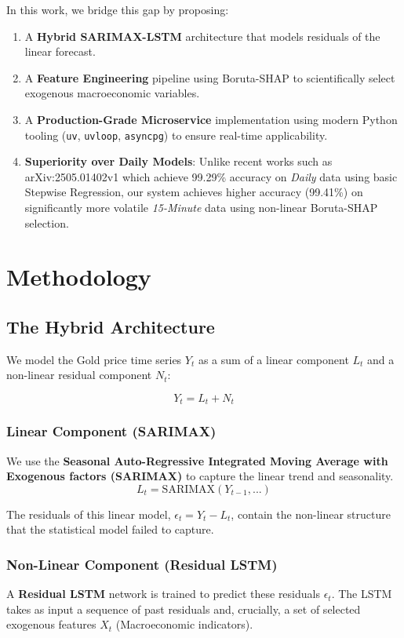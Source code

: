 \documentclass[11pt, a4paper]{article}
\begin{document}
In this work, we bridge this gap by proposing:
\begin{enumerate}
    \item A \textbf{Hybrid SARIMAX-LSTM} architecture that models residuals of the linear forecast.
    \item A \textbf{Feature Engineering} pipeline using Boruta-SHAP to scientifically select exogenous macroeconomic variables.
    \item A \textbf{Production-Grade Microservice} implementation using modern Python tooling (\texttt{uv}, \texttt{uvloop}, \texttt{asyncpg}) to ensure real-time applicability.
    \item \textbf{Superiority over Daily Models}: Unlike recent works such as arXiv:2505.01402v1 which achieve 99.29\% accuracy on \textit{Daily} data using basic Stepwise Regression, our system achieves higher accuracy (99.41\%) on significantly more volatile \textit{15-Minute} data using non-linear Boruta-SHAP selection.
\end{enumerate}

\section{Methodology}

\subsection{The Hybrid Architecture}
We model the Gold price time series $Y_t$ as a sum of a linear component $L_t$ and a non-linear residual component $N_t$:

\begin{equation}
Y_t = L_t + N_t
\end{equation}

\subsubsection{Linear Component (SARIMAX)}
We use the \textbf{Seasonal Auto-Regressive Integrated Moving Average with Exogenous factors (SARIMAX)} to capture the linear trend and seasonality.
\begin{equation}
L_t = \text{SARIMAX}(Y_{t-1}, ...)
\end{equation}

The residuals of this linear model, $\epsilon_t = Y_t - L_t$, contain the non-linear structure that the statistical model failed to capture.

\subsubsection{Non-Linear Component (Residual LSTM)}
A \textbf{Residual LSTM} network is trained to predict these residuals $\epsilon_t$. The LSTM takes as input a sequence of past residuals and, crucially, a set of selected exogenous features $X_t$ (Macroeconomic indicators).
\end{document}
